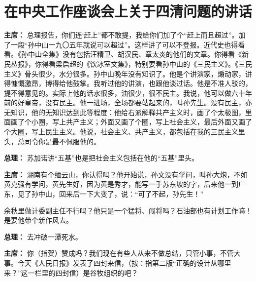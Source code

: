 \section[在中央工作座谈会上关于四清问题的讲话（一九六四年十二月二十日）]{在中央工作座谈会上关于四清问题的讲话}

\begin{list}{}{
    \setlength{\topsep}{0pt}        %
    \setlength{\partopsep}{0pt}     %
    \setlength{\parsep}{\parskip}   %
    \setlength{\itemsep}{\lineskip}       %
    \setlength{\labelsep}{0pt}%
    \setlength{\labelwidth}{3em}%
    \setlength{\itemindent}{0pt}%
    \setlength\listparindent{\parindent}
    \setlength{\leftmargin}{3em}
    \setlength{\rightmargin}{0pt}
    }

\item[\textbf{主席：}] 总理报告，你们连‘赶上”都不敢提，我给你们加了个“赶上而且超过”。加了一段“孙中山一九〇五年就说可以超过”。这样讲了可以不登报。近代史也得看看。《孙中山全集》没有包括汪精卫、胡汉民、章太炎的他们的文章。你得看《新民丛报》，你得看梁启超的《饮冰室文集》，特别要看孙中山的《三民主义》。《三民主义》骨头很少，水分很多。孙中山晚年没有知识了。他是个讲演家，煽动家，讲得慷慨激昂，博得给他鼓掌。我听过他的讲演，也跟他谈过话。他是不准人驳的，提不得意见的。实际上他的话水很多，油很少，很不民主。我说，他可以做六十年前的好皇帝，没有民主。他一进场，全场都要站起来的，叫孙先生。没有民主，亦无知识，他的无知识达到此等程度：他给右派解释共产主义时，画了个太极图，里面画了个小圈，写上共产主义；外面又画了个圈，写上社会主义，最后外面又画了个大圈，写上民生主义。他说，社会主义、共产主义，都包括在我的三民主义里头，总司令你是最不佩服他的。

\item[\textbf{总理：}] 苏加诺讲“五基”也是把社会主义包括在他的“五基”里头。

\item[\textbf{主席：}] 湖南有个缅云山，你认得吗？他开始说，孙文没有学问，叫孙大炮，不如黄克强有学问，黄先生好，因为黄是秀才，能写一手苏东坡的字，后来他一到广东，见了孙中山，回来后一下大变了，说：“可了不起，孙先生！”

余秋里做计委副主任不行吗？他只是一个猛将、闯将吗？石油部也有计划工作嘛！是要他带个新作风去。

\item[\textbf{总理：}] 去冲破一潭死水。

\item[\textbf{主席：}] 你（指贺）赞成吗？我们现在有些人从来不做总结，只管小事，不管大事。今天《人民日报》发表了四封来信，（按：指第二版“正确的设计从哪里来？”这一栏里的四封信）是谷牧组织的吧？


\end{list}
